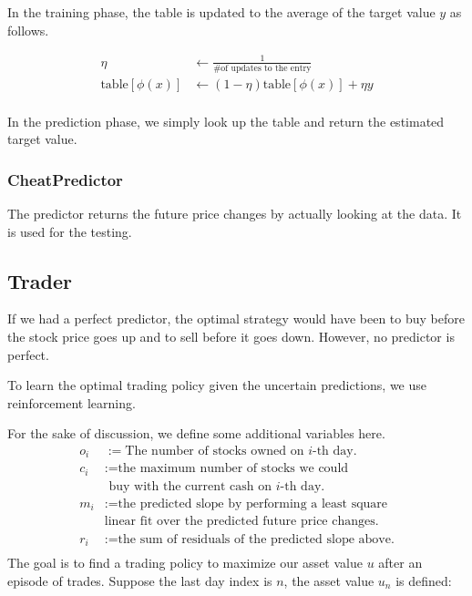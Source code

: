 \documentclass[twocolumn,10pt]{asme2ej}
\begin{document}
In the training phase, the table is updated to the average of the
target value $y$ as follows.

\begin{align*}
  \eta &\gets \frac{1}{\text{\# of updates to the entry}} \\
  \text{table}[\phi(x)] &\gets (1 - \eta)\text{table}[\phi(x)] + \eta y \\
\end{align*}

In the prediction phase, we simply look up the table and return the
estimated target value.

\subsubsection{CheatPredictor}

The predictor returns the future price changes by actually looking at the
data. It is used for the testing.

\subsection{Trader}

If we had a perfect predictor, the optimal strategy would have been to
buy before the stock price goes up and to sell before it goes
down. However, no predictor is perfect.

To learn the optimal trading policy given the uncertain predictions,
we use reinforcement learning.

For the sake of discussion, we define some additional variables here.
\begin{align*}
  o_i &:= \text{The number of stocks owned on }i\text{-th day.} \\
  c_i &:= \text{the maximum number of stocks we could}\\
  & \text{ buy with the current cash on }i\text{-th day.} \\
  m_i &:= \text{the predicted slope by performing a least square} \\
  & \text{linear fit over the predicted future price changes.} \\
  r_i &:= \text{the sum of residuals of the predicted slope above.} \\
\end{align*}
The goal is to find a trading policy to maximize our asset value $u$
after an episode of trades. Suppose the last day index is $n$, the
asset value $u_n$ is defined:
\end{document}
